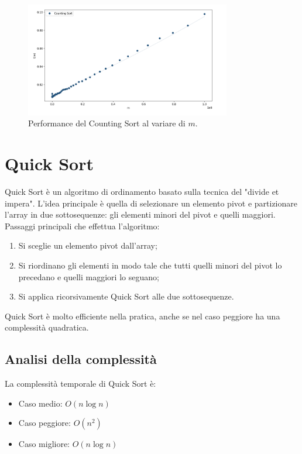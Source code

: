 \documentclass[a4paper, 12pt, oneside]{book}
\begin{document}
\begin{figure}[H]
    \centering
    \includegraphics[width=0.8\textwidth]{images/grafico_counting_sort_m.png}
    \caption{Performance del Counting Sort al variare di \(m\).}
    \label{fig:counting_sort_m}
\end{figure}


\chapter{Quick Sort}\label{chap:Quick Sort} %

Quick Sort è un algoritmo di ordinamento basato sulla tecnica del "divide et impera".
L'idea principale è quella di selezionare un elemento pivot e partizionare l'array in due sottosequenze: gli elementi minori del pivot e quelli maggiori.
Passaggi principali che effettua l'algoritmo:

\begin{enumerate}
	\item Si sceglie un elemento pivot dall'array;
	\item Si riordinano gli elementi in modo tale che tutti quelli minori del pivot lo precedano e quelli maggiori lo seguano;
	\item Si applica ricorsivamente Quick Sort alle due sottosequenze.
\end{enumerate}

\noindent Quick Sort è molto efficiente nella pratica, anche se nel caso peggiore ha una complessità quadratica.

\section{Analisi della complessità}

La complessità temporale di Quick Sort è:
\begin{itemize}
	\item Caso medio: \(O(n \log n)\) 
	\item Caso peggiore: \(O(n^2)\)
	\item Caso migliore: \(O(n \log n)\)
\end{itemize}
\end{document}
